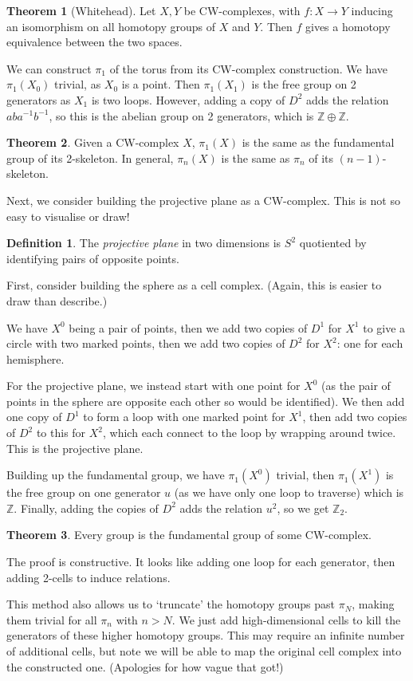 \documentclass[a4paper,12pt]{article}
\newcommand{\ZZ}{\mathbb{Z}}
\theoremstyle{definition}
\newtheorem*{thm}{Theorem}
\newtheorem*{defn}{Definition}
\begin{document}
\begin{thm}[Whitehead]
	Let $X, Y$ be CW-complexes, with $f: X\to Y$ inducing an isomorphism on all homotopy groups of $X$ and $Y$.
	Then $f$ gives a homotopy equivalence between the two spaces.
\end{thm}

We can construct $\pi_1$ of the torus from its CW-complex construction.
We have $\pi_1(X_0)$ trivial, as $X_0$ is a point.
Then $\pi_1(X_1)$ is the free group on 2 generators as $X_1$ is two loops.
However, adding a copy of $D^2$ adds the relation $aba^{-1}b^{-1}$, so this is the abelian group on 2 generators, which is $\ZZ\oplus\ZZ$. 

\begin{thm}
	Given a CW-complex $X$, $\pi_1(X)$ is the same as the fundamental group of its 2-skeleton.
	In general, $\pi_n(X)$ is the same as $\pi_n$ of its $(n-1)$-skeleton.
\end{thm}

Next, we consider building the projective plane as a CW-complex.
This is not so easy to visualise or draw!

\begin{defn}
The \emph{projective plane} in two dimensions is $S^2$ quotiented by identifying pairs of opposite points.
\end{defn}

First, consider building the sphere as a cell complex.
(Again, this is easier to draw than describe.)

We have $X^0$ being a pair of points, then we add two copies of $D^1$ for $X^1$ to give a circle with two marked points, then we add two copies of $D^2$ for $X^2$: one for each hemisphere.

For the projective plane, we instead start with one point for $X^0$ (as the pair of points in the sphere are opposite each other so would be identified).
We then add one copy of $D^1$ to form a loop with one marked point for $X^1$, then add two copies of $D^2$ to this for $X^2$, which each connect to the loop by wrapping around twice.
This is the projective plane.

Building up the fundamental group, we have $\pi_1(X^0)$ trivial, then $\pi_1(X^1)$ is the free group on one generator $u$ (as we have only one loop to traverse) which is $\ZZ$.
Finally, adding the copies of $D^2$ adds the relation $u^2$, so we get $\ZZ_2$.

\begin{thm}
Every group is the fundamental group of some CW-complex.
\end{thm}

The proof is constructive. It looks like adding one loop for each generator, then adding 2-cells to induce relations.

This method also allows us to `truncate' the homotopy groups past $\pi_N$, making them trivial for all $\pi_n$ with $n > N$.
We just add high-dimensional cells to kill the generators of these higher homotopy groups.
This may require an infinite number of additional cells, but note we will be able to map the original cell complex into the constructed one.
(Apologies for how vague that got!)
\end{document}
